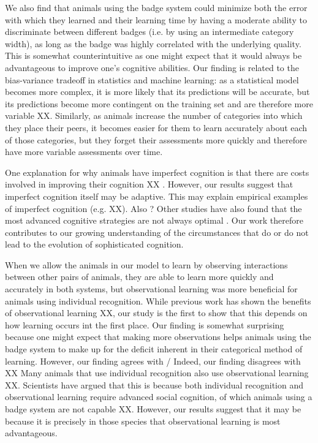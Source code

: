 We also find that animals using the badge system could minimize both the error with which they learned and their learning time by having a moderate ability to discriminate between different badges (i.e. by using an intermediate category width), as long as the badge was highly correlated with the underlying quality. This is somewhat counterintuitive as one might expect that it would always be advantageous to improve one's cognitive abilities. Our finding is related to the bias-variance tradeoff in statistics and machine learning: as a statistical model becomes more complex, it is more likely that its predictions will be accurate, but its predictions become more contingent on the training set and are therefore more variable XX. Similarly, as animals increase the number of categories into which they place their peers, it becomes easier for them to learn accurately about each of those categories, but they forget their assessments more quickly and therefore have more variable assessments over time. 

One explanation for why animals have imperfect cognition is that there are costs involved in improving their cognition XX \cite{Gavrilets:2006fk}. However, our results suggest that imperfect cognition itself may be adaptive. This may explain empirical examples of imperfect cognition (e.g. \cite{Kikuchi:2010ys} XX). Also \cite{Stoddard:2011zr}?
Other studies have also found that the most advanced cognitive strategies are not always optimal \cite{Brush:2016kx,Kerr:2003vn,Dunlap:2009vn,Stephens:1991fk}. Our work therefore contributes to our growing understanding of the circumstances that do or do not lead to the evolution of sophisticated cognition.

When we allow the animals in our model to learn by observing interactions between other pairs of animals, they are able to learn more quickly and accurately in both systems, but observational learning was more beneficial for animals using individual recognition. While previous work has shown the benefits of observational learning XX, our study is the first to show that this depends on how learning occurs int the first place. Our finding is somewhat surprising because one might expect that making more observations helps animals using the badge system to make up for the deficit inherent in their categorical method of learning. However, our finding agrees with / Indeed, our finding disagrees with XX Many animals that use individual recognition also use observational learning XX. Scientists have argued that this is because both individual recognition and observational learning require advanced social cognition, of which animals using a badge system are not capable XX. However, our results suggest that it may be because it is precisely in those species that observational learning is most advantageous.

